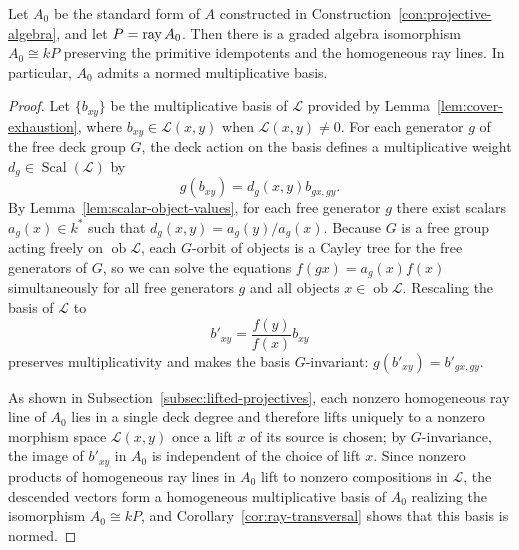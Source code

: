 \begin{proposition}
\label{prop:scalar-normalization}
Let $A_0$ be the standard form of $A$ constructed in
Construction~\ref{con:projective-algebra}, and let $P=\operatorname{ray} A_0$. Then there
is a graded algebra isomorphism $A_0\cong kP$ preserving the primitive
idempotents and the homogeneous ray lines. In particular, $A_0$ admits a
normed multiplicative basis.
\end{proposition}
\begin{proof}
Let $\{b_{xy}\}$ be the multiplicative basis of $\mathcal L$ provided by
Lemma~\ref{lem:cover-exhaustion}, where $b_{xy}\in\mathcal L(x,y)$ when
$\mathcal L(x,y)\ne0$. For each generator $g$ of the free deck group $G$, the
deck action on the basis defines a multiplicative weight $d_g\in\operatorname{Scal}(\mathcal L)$
by
\[
 g(b_{xy})=d_g(x,y)b_{gx,gy}.
\]
By Lemma~\ref{lem:scalar-object-values}, for each free generator $g$ there
exist scalars $a_g(x)\in k^*$ such that $d_g(x,y)=a_g(y)/a_g(x)$. Because
$G$ is a free group acting freely on $\operatorname{ob}\mathcal L$, each
$G$-orbit of objects is a Cayley tree for the free generators of $G$, so we
can solve the equations $f(gx)=a_g(x)f(x)$ simultaneously for all free
generators $g$ and all objects $x\in\operatorname{ob}\mathcal L$. Rescaling
the basis of $\mathcal L$ to
\[
 b'_{xy}=\frac{f(y)}{f(x)}b_{xy}
\]
preserves multiplicativity and makes the basis $G$-invariant:
$g(b'_{xy})=b'_{gx,gy}$.

As shown in Subsection~\ref{subsec:lifted-projectives}, each nonzero
homogeneous ray line of $A_0$ lies in a single deck degree and therefore
lifts uniquely to a nonzero morphism space $\mathcal L(x,y)$ once a lift $x$
of its source is chosen; by $G$-invariance, the image of $b'_{xy}$ in $A_0$
is independent of the choice of lift $x$. Since nonzero products of
homogeneous ray lines in $A_0$ lift to nonzero compositions in $\mathcal L$,
the descended vectors form a homogeneous multiplicative basis of $A_0$
realizing the isomorphism $A_0\cong kP$, and Corollary~\ref{cor:ray-transversal}
shows that this basis is normed.
\end{proof}


